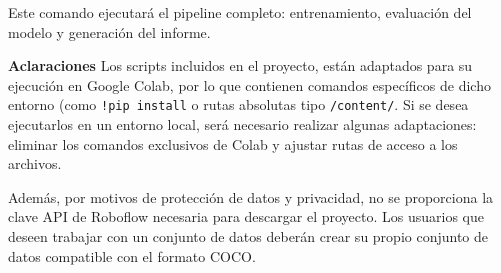 \begin{itemize}
   Este comando ejecutará el pipeline completo: entrenamiento, evaluación del modelo y generación del informe.

    \textbf{Aclaraciones}
    Los scripts incluidos en el proyecto, están adaptados para su ejecución en Google Colab, por lo que contienen comandos específicos de dicho entorno (como \texttt{!pip install} o rutas absolutas tipo \texttt{/content/}. Si se desea ejecutarlos en un entorno local, será necesario realizar algunas adaptaciones: eliminar los comandos exclusivos de Colab y ajustar rutas de acceso a los archivos.

    Además, por motivos de protección de datos y privacidad, no se proporciona la clave API de Roboflow necesaria para descargar el proyecto. Los usuarios que deseen trabajar con un conjunto de datos deberán crear su propio conjunto de datos compatible con el formato COCO. 
   
\end{itemize}



    
     